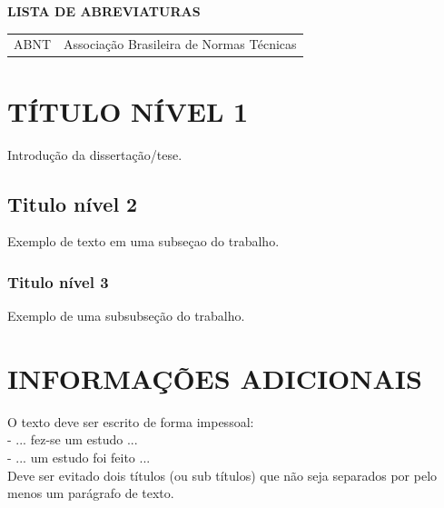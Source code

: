 \documentclass[a4paper,12pt,oneside]{article}
\numberwithin{equation}{section}
\begin{document}
\newpage
\thispagestyle{empty}
\begin{center}
	\textbf{\Large{LISTA DE ABREVIATURAS}}
\end{center}


\begin{changemargin}{1.5cm}{1.5cm} 
	\begin{tabular}{ll}
		ABNT 	&	Associação Brasileira de Normas Técnicas\\

	\end{tabular}
\end{changemargin}






\section{TÍTULO NÍVEL 1}

Introdução da dissertação/tese.

\subsection{Titulo nível 2}

Exemplo de texto em uma subseçao do trabalho.


\subsubsection{Titulo nível 3}

Exemplo de uma subsubseção do trabalho.


\section{INFORMAÇÕES ADICIONAIS}

O texto deve ser escrito de forma impessoal:\\

\noindent- ... fez-se um estudo ...\\
- ... um estudo foi feito ...\\


Deve ser evitado dois títulos (ou sub títulos) que não seja separados por pelo menos um
parágrafo de texto.
\end{document}

